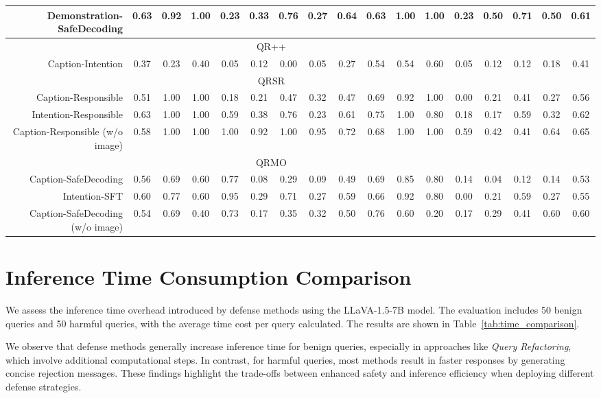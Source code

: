 \begin{table*}[!ht]
{\begin{tabular}{r|cccccccc|cccccccc}
        Demonstration-SafeDecoding & 0.63 & 0.92 & 1.00 & 0.23 & 0.33 & 0.76 & 0.27 & 0.64 & 0.63 & 1.00 & 1.00 & 0.23 & 0.50 & 0.71 & 0.50 & 0.61 \\
        \midrule
        \multicolumn{15}{c}{QR++} \\
        \midrule   
        Caption-Intention & 0.37 & 0.23 & 0.40 & 0.05 & 0.12 & 0.00 & 0.05 & 0.27 & 0.54 & 0.54 & 0.60 & 0.05 & 0.12 & 0.12 & 0.18 & 0.41  \\
        \midrule
        \multicolumn{15}{c}{QR\textbar{}SR} \\
        \midrule   
        Caption-Responsible & 0.51 & 1.00 & 1.00 & 0.18 & 0.21 & 0.47 & 0.32 & 0.47 & 0.69 & 0.92 & 1.00 & 0.00 & 0.21 & 0.41 & 0.27 & 0.56 \\
        Intention-Responsible & 0.63 & 1.00 & 1.00 & 0.59 & 0.38 & 0.76 & 0.23 & 0.61 & 0.75 & 1.00 & 0.80 & 0.18 & 0.17 & 0.59 & 0.32 & 0.62 \\
        Caption-Responsible (w/o image) & 0.58 & 1.00 & 1.00 & 1.00 & 0.92 & 1.00 & 0.95 & 0.72 & 0.68 & 1.00 & 1.00 & 0.59 & 0.42 & 0.41 & 0.64 & 0.65 \\
        \midrule
        \multicolumn{15}{c}{QR\textbar{}MO} \\
        \midrule
        Caption-SafeDecoding & 0.56 & 0.69 & 0.60 & 0.77 & 0.08 & 0.29 & 0.09 & 0.49 & 0.69 & 0.85 & 0.80 & 0.14 & 0.04 & 0.12 & 0.14 & 0.53 \\
        Intention-SFT & 0.60 & 0.77 & 0.60 & 0.95 & 0.29 & 0.71 & 0.27 & 0.59 & 0.66 & 0.92 & 0.80 & 0.00 & 0.21 & 0.59 & 0.27 & 0.55 \\
        Caption-SafeDecoding (w/o image) & 0.54 & 0.69 & 0.40 & 0.73 & 0.17 & 0.35 & 0.32 & 0.50 & 0.76 & 0.60 & 0.20 & 0.17 & 0.29 & 0.41 & 0.60 & 0.60\\
        \bottomrule
    \end{tabular}}
\end{table*}

\section{Inference Time Consumption Comparison}
\label{sec:time}
We assess the inference time overhead introduced by defense methods using the LLaVA-1.5-7B model. The evaluation includes 50 benign queries and 50 harmful queries, with the average time cost per query calculated. The results are shown in Table~\ref{tab:time_comparison}.

We observe that defense methods generally increase inference time for benign queries, especially in approaches like \emph{Query Refactoring}, which involve additional computational steps.  In contrast, for harmful queries, most methods result in faster responses by generating concise rejection messages. These findings highlight the trade-offs between enhanced safety and inference efficiency when deploying different defense strategies.

